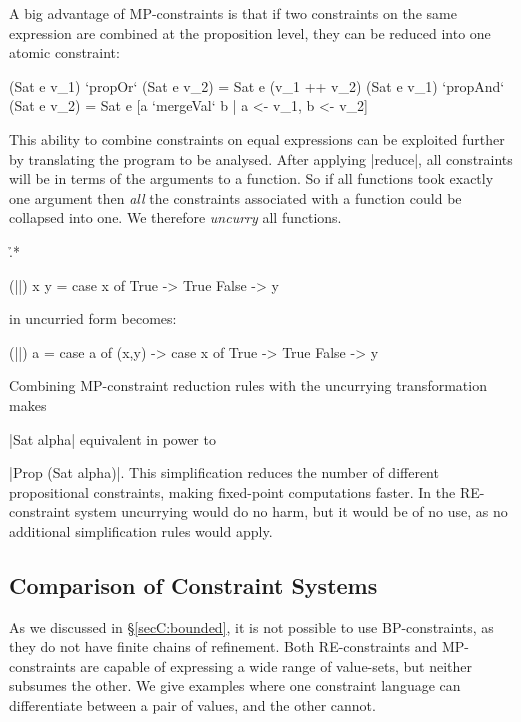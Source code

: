 A big advantage of MP-constraints is that if two constraints on the same expression are combined at the proposition level, they can be reduced into one atomic constraint:

\ignore\begin{code}
(Sat e v_1)  `propOr`   (Sat e v_2) = Sat e (v_1 ++ v_2)
(Sat e v_1)  `propAnd`  (Sat e v_2) = Sat e [a `mergeVal` b | a <- v_1, b <- v_2]
\end{code}

\noindent This ability to combine constraints on equal expressions can be exploited further by translating the program to be analysed. After applying |reduce|, all constraints will be in terms of the arguments to a function. So if all functions took exactly one argument then \textit{all} the constraints associated with a function could be collapsed into one. We therefore \textit{uncurry} all functions.

\begin{example}
\h{.*}\begin{code}
(||) x y = case  x of
                 True   -> True
                 False  -> y
\end{code}

\noindent in uncurried form becomes:

\begin{onepage}
\ignore\begin{code}
(||) a = case  a of
               (x,y) -> case  x of
                              True    -> True
                              False   -> y
\end{code}
\end{onepage}
\end{example}

Combining MP-constraint reduction rules with the uncurrying transformation makes \ignore|Sat alpha| equivalent in power to \ignore|Prop (Sat alpha)|. This simplification reduces the number of different propositional constraints, making fixed-point computations faster. In the RE-constraint system uncurrying would do no harm, but it would be of no use, as no additional simplification rules would apply.

\subsection{Comparison of Constraint Systems}

As we discussed in \S\ref{secC:bounded}, it is not possible to use BP-constraints, as they do not have finite chains of refinement. Both RE-constraints and MP-constraints are capable of expressing a wide range of value-sets, but neither subsumes the other. We give examples where one constraint language can differentiate between a pair of values, and the other cannot.

